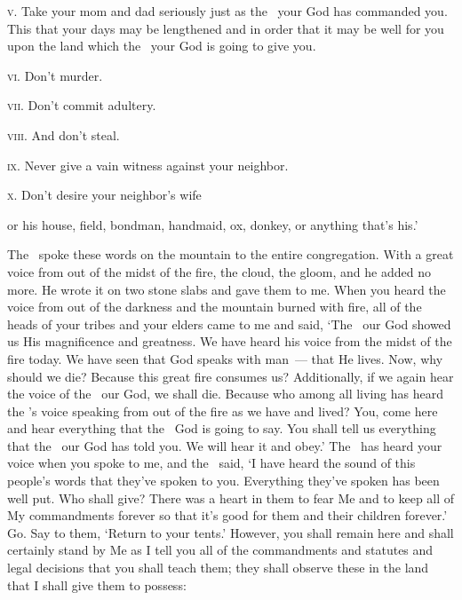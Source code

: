\begin{inparaenum}
   \textsc{v.} Take your mom and dad seriously just as the \lord\ your God has commanded you. This that your days may be lengthened and in order that it may be well for you upon the land which the \lord\ your God is going to give you.%
  
   \textsc{vi.} Don't murder.%
  
   \textsc{vii.} Don't commit adultery.%
  
   \textsc{viii.} And don't steal.%
  
   \textsc{ix.} Never give a vain witness against your neighbor.%
  
   \textsc{x.} Don't desire your neighbor's wife
  
  or his house, field, bondman, handmaid, ox, donkey, or anything that's his.'%
  
   The \lord\ spoke these words on the mountain to the entire congregation. With a great voice from out of the midst of the fire, the cloud, the gloom, and he added no more. He wrote it on two stone slabs and gave them to me.%
   When you heard the voice from out of the darkness and the mountain burned with fire, all of the heads of your tribes and your elders came to me%
   and said, `The \lord\ our God showed us His magnificence and greatness. We have heard his voice from the midst of the fire today. We have seen that God speaks with man~--- that He lives.%
   Now, why should we die? Because this great fire consumes us? Additionally, if we again hear the voice of the \lord\ our God, we shall die.%
   Because who among all living has heard the \lord's voice speaking from out of the fire as we have and lived?%
   You, come here and hear everything that the \lord\ God is going to say. You shall tell us everything that the \lord\ our God has told you. We will hear it and obey.'%
   The \lord\ has heard your voice when you spoke to me, and the \lord\ said, `I have heard the sound of this people's words that they've spoken to you. Everything they've spoken has been well put.%
   Who shall give? There was a heart in them to fear Me and to keep all of My commandments forever so that it's good for them and their children forever.'%
   Go. Say to them, `Return to your tents.'%
   However, you shall remain here and shall certainly stand by Me as I tell you all of the commandments and statutes and legal decisions that you shall teach them; they shall observe these in the land that I shall give them to possess:%
\end{inparaenum}
